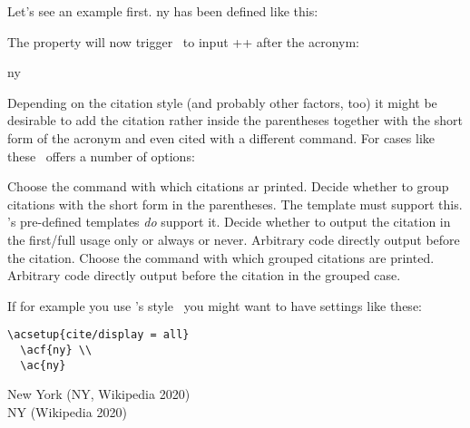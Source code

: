 \documentclass{acro-manual}
\begin{document}
Let's see an example first. \acs*{ny} has been defined like this:
\begin{sourcecode}
\end{sourcecode}
The property  will now trigger \acro\ to input
\verbcode+\cite{NewYork}+ after the acronym:
\begin{example}
  \ac{ny}
\end{example}
Depending on the citation style (and probably other factors, too) it might be
desirable to add the citation rather inside the parentheses together with the
short form of the acronym and even cited with a different command.  For cases
like these \acro\ offers a number of options:
\begin{options}
    Choose the command with which citations ar printed.
    Decide whether to group citations with the short form in the parentheses.
    The template must support this.  \acro's pre-defined templates \emph{do}
    support it.
    Decide whether to output the citation in the first/full usage only or
    always or never.
    Arbitrary code directly output before the citation.
    Choose the command with which grouped citations are printed.
  \Initial{,\textvisiblespace}
    Arbitrary code directly output before the citation in the grouped case.
\end{options}

If for example you use 's 
style~\cite{pkg:biblatex} you might want to have settings like these:
\begin{sourcecode}
\end{sourcecode}
\begin{cnltxcode}
\begin{lstlisting}[style=cnltx]
  \acsetup{cite/display = all}
  \acf{ny} \\
  \ac{ny}
\end{lstlisting}
\tcblower
  New York (NY, Wikipedia 2020) \\
  NY (Wikipedia 2020)
\end{cnltxcode}
\end{document}
